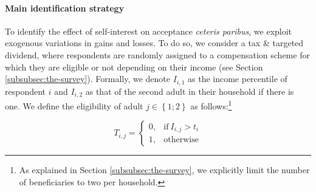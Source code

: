 \documentclass[12pt]{article} %
\begin{document}
\paragraph{Main identification strategy}

To identify the effect of self-interest on acceptance \textit{ceteris paribus}, we exploit exogenous variations in gains and losses. To do so, we consider a tax \& targeted dividend, where respondents are randomly assigned to a compensation scheme for which they are eligible or not depending on their income (see Section \ref{subsubsec:the-survey}). Formally, we denote $I_{i,1}$ as the income percentile of respondent $i$ and $I_{i,2}$ as that of the second adult in their household if there is one. We define the eligibility of adult $j\in \left\{1;2\right\}$ as follows:\footnote{As explained in Section \ref{subsubsec:the-survey}, we explicitly limit the number of beneficiaries to two per household.}

\begin{equation}
T_{i,j} =
\begin{cases}
  0, & \text{if}\ I_{i,j} > t_i \\
  1, & \text{otherwise}
\end{cases}
\end{equation}

\medskip


\end{document}
